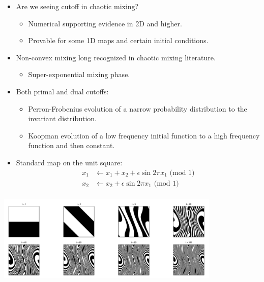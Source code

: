 \documentclass[12pt,t]{beamer}
\begin{document}
\begin{frame}
  \begin{itemize}
  \item Are we seeing cutoff in chaotic mixing?
    \begin{itemize}
    \item Numerical supporting evidence in 2D and higher.
    \item Provable for some 1D maps and certain initial conditions.
    \end{itemize}
  \item Non-convex mixing long recognized in chaotic mixing literature.
    \begin{itemize}
    \item Super-exponential mixing phase.
    \end{itemize}
  \item Both primal and dual cutoffs:
    \begin{itemize}
    \item Perron-Frobenius evolution of a narrow probability
      distribution to the invariant distribution.
    \item Koopman evolution of a low frequency initial function to a
      high frequency function and then constant.
    \end{itemize}
  \end{itemize}
\end{frame}
\begin{frame}
  \begin{itemize}
  \item Standard map on the unit square:
    \begin{align*}
      x_1 &\leftarrow x_1 + x_2 + \epsilon \sin 2\pi x_1 \text{ (mod 1)} \\
      x_2 &\leftarrow x_2 + \epsilon \sin 2\pi x_1 \text{ (mod 1)} \\
    \end{align*}
  \end{itemize}
  \vspace{-1cm}
  \begin{center}
    \includegraphics[width=0.8\textwidth]{Standardmapexample_crop}
  \end{center}
\end{frame}
\end{document}
